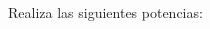 \documentclass[12pt,addpoints]{evalua}
\begin{document}
\begin{questions}

    \question[6] Realiza las siguientes potencias:

    \begin{multicols}{3}
    \end{multicols}


\end{questions}
\end{document}
